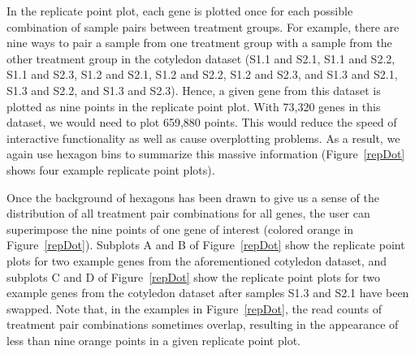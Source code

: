 \documentclass[referee]{biom}
\begin{document}
In the replicate point plot, each gene is plotted once for each possible combination of sample pairs between treatment groups. For example, there are nine ways to pair a sample from one treatment group with a sample from the other treatment group in the cotyledon dataset (S1.1 and S2.1, S1.1 and S2.2, S1.1 and S2.3, S1.2 and S2.1, S1.2 and S2.2, S1.2 and S2.3, and S1.3 and S2.1, S1.3 and S2.2, and S1.3 and S2.3). Hence, a given gene from this dataset is plotted as nine points in the replicate point plot. With 73,320 genes in this dataset, we would need to plot 659,880 points. This would reduce the speed of interactive functionality as well as cause overplotting problems. As a result, we again use hexagon bins to summarize this massive information (Figure~\ref{repDot} shows four example replicate point plots).

\newpage

Once the background of hexagons has been drawn to give us a sense of the distribution of all treatment pair combinations for all genes, the user can superimpose the nine points of one gene of interest (colored orange in Figure~\ref{repDot}). Subplots A and B of Figure~\ref{repDot} show the replicate point plots for two example genes from the aforementioned cotyledon dataset, and subplots C and D of Figure~\ref{repDot} show the replicate point plots for two example genes from the cotyledon dataset after samples S1.3 and S2.1 have been swapped. Note that, in the examples in Figure~\ref{repDot}, the read counts of treatment pair combinations sometimes overlap, resulting in the appearance of less than nine orange points in a given replicate point plot.
\end{document}
